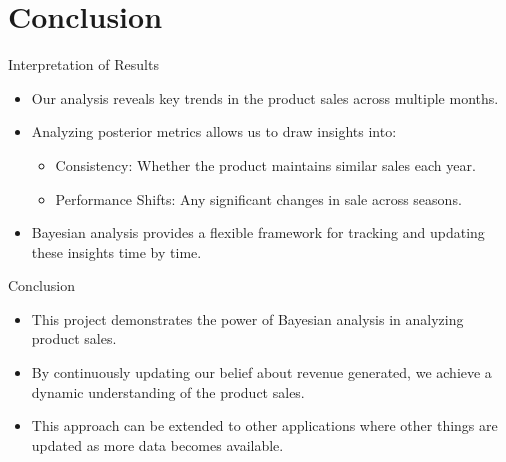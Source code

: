 \section{Conclusion}

\begin{frame}{Interpretation of Results}

  \begin{itemize}
    \item Our analysis reveals key trends in the product sales across multiple months.
    \item Analyzing posterior metrics allows us to draw insights into:
    \begin{itemize}
        \item Consistency: Whether the product maintains similar sales each year.
        \item Performance Shifts: Any significant changes in sale across seasons.
    \end{itemize}
    \item Bayesian analysis provides a flexible framework for tracking and updating these insights time by time.
  \end{itemize}
  
\end{frame}

\begin{frame}{Conclusion}

  \begin{itemize}
    \item This project demonstrates the power of Bayesian analysis in analyzing product sales.
    \item By continuously updating our belief about revenue generated, we achieve a dynamic understanding of the product sales.
    \item This approach can be extended to other applications where other things are updated as more data becomes available.
  \end{itemize}
  
\end{frame}